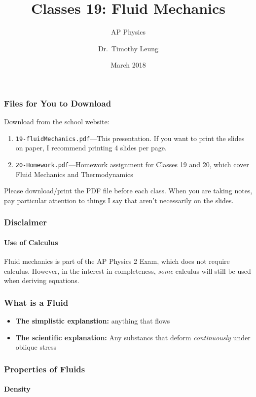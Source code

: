 \documentclass[12pt,aspectratio=169]{beamer}
\title{Classes 19: Fluid Mechanics}
\subtitle{AP Physics}
\author[TML]{Dr.\ Timothy Leung}
\institute{Olympiads School}
\date{March 2018}
\begin{document}
\begin{frame}
  \maketitle
\end{frame}



\begin{frame}
  \frametitle{Files for You to Download}
  Download from the school website:
  \begin{enumerate}
  \item\texttt{19-fluidMechanics.pdf}---This
    presentation. If you want to print the slides on paper, I recommend
    printing 4 slides per page.
  \item\texttt{20-Homework.pdf}---Homework assignment for Classes 19 and 20,
    which cover Fluid Mechanics and Thermodynamics
  \end{enumerate}

  \vspace{.2in}Please download/print the PDF file before each class. When you
  are taking notes, pay particular attention to things I say that aren't
  necessarily on the slides.
\end{frame}


\begin{frame}
  \frametitle{Disclaimer}
  \framesubtitle{Use of Calculus}
  Fluid mechanics is part of the AP Physics 2 Exam, which does not require
  calculus. However, in the interest in completeness, \emph{some} calculus will
  still be used when deriving equations.
\end{frame}


\begin{frame}
  \frametitle{What is a Fluid}

  \begin{itemize}
  \item\textbf{The simplistic explanstion:} anything that flows

  \item\textbf{The scientific explanation:} Any substancs that deform
    \emph{continuously} under oblique stress
  \end{itemize}
\end{frame}

\begin{frame}
  \frametitle{Properties of Fluids}
  \framesubtitle{Density}
\end{frame}
\end{document}
